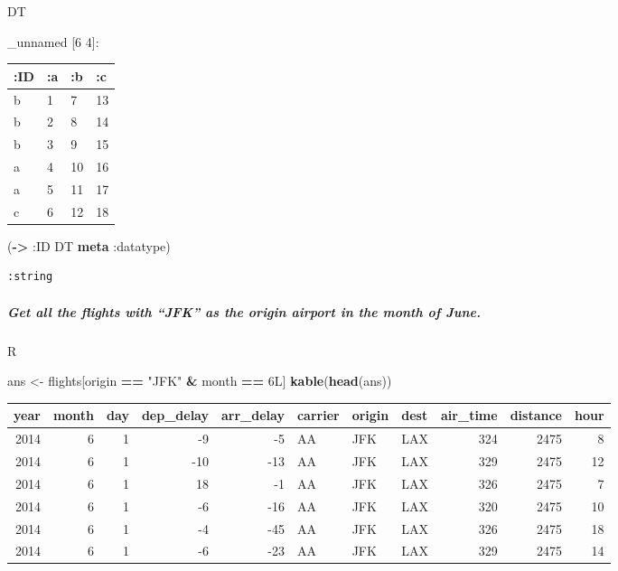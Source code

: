 \documentclass[]{article}
\newenvironment{Shaded}{\begin{snugshade}}{\end{snugshade}}
\newcommand{\KeywordTok}[1]{\textcolor[rgb]{0.13,0.29,0.53}{\textbf{#1}}}
\newcommand{\StringTok}[1]{\textcolor[rgb]{0.31,0.60,0.02}{#1}}
\newcommand{\OperatorTok}[1]{\textcolor[rgb]{0.81,0.36,0.00}{\textbf{#1}}}
\newcommand{\AttributeTok}[1]{\textcolor[rgb]{0.77,0.63,0.00}{#1}}
\newcommand{\NormalTok}[1]{#1}
\let\oldsubparagraph\subparagraph
\renewcommand{\subparagraph}[1]{\oldsubparagraph{#1}\mbox{}}
\begin{document}
\begin{Shaded}
\begin{Highlighting}[]
\NormalTok{DT}
\end{Highlighting}
\end{Shaded}

\_unnamed {[}6 4{]}:

\begin{longtable}[]{@{}llll@{}}
\toprule
:ID & :a & :b & :c\tabularnewline
\midrule
\endhead
b & 1 & 7 & 13\tabularnewline
b & 2 & 8 & 14\tabularnewline
b & 3 & 9 & 15\tabularnewline
a & 4 & 10 & 16\tabularnewline
a & 5 & 11 & 17\tabularnewline
c & 6 & 12 & 18\tabularnewline
\bottomrule
\end{longtable}

\begin{Shaded}
\begin{Highlighting}[]
\NormalTok{(}\KeywordTok{->} \AttributeTok{:ID}\NormalTok{ DT }\KeywordTok{meta} \AttributeTok{:datatype}\NormalTok{)}
\end{Highlighting}
\end{Shaded}

\begin{verbatim}
:string
\end{verbatim}

\subparagraph{\texorpdfstring{Get all the flights with ``JFK'' as the
origin airport in the month of
June.}{Get all the flights with JFK as the origin airport in the month of June.}}\label{get-all-the-flights-with-jfk-as-the-origin-airport-in-the-month-of-june.}

R

\begin{Shaded}
\begin{Highlighting}[]
\NormalTok{ans <-}\StringTok{ }\NormalTok{flights[origin }\OperatorTok{==}\StringTok{ "JFK"} \OperatorTok{&}\StringTok{ }\NormalTok{month }\OperatorTok{==}\StringTok{ }\NormalTok{6L]}
\KeywordTok{kable}\NormalTok{(}\KeywordTok{head}\NormalTok{(ans))}
\end{Highlighting}
\end{Shaded}

\begin{longtable}[]{@{}rrrrrlllrrr@{}}
\toprule
year & month & day & dep\_delay & arr\_delay & carrier & origin & dest &
air\_time & distance & hour\tabularnewline
\midrule
\endhead
2014 & 6 & 1 & -9 & -5 & AA & JFK & LAX & 324 & 2475 & 8\tabularnewline
2014 & 6 & 1 & -10 & -13 & AA & JFK & LAX & 329 & 2475 &
12\tabularnewline
2014 & 6 & 1 & 18 & -1 & AA & JFK & LAX & 326 & 2475 & 7\tabularnewline
2014 & 6 & 1 & -6 & -16 & AA & JFK & LAX & 320 & 2475 &
10\tabularnewline
2014 & 6 & 1 & -4 & -45 & AA & JFK & LAX & 326 & 2475 &
18\tabularnewline
2014 & 6 & 1 & -6 & -23 & AA & JFK & LAX & 329 & 2475 &
14\tabularnewline
\bottomrule
\end{longtable}
\end{document}
